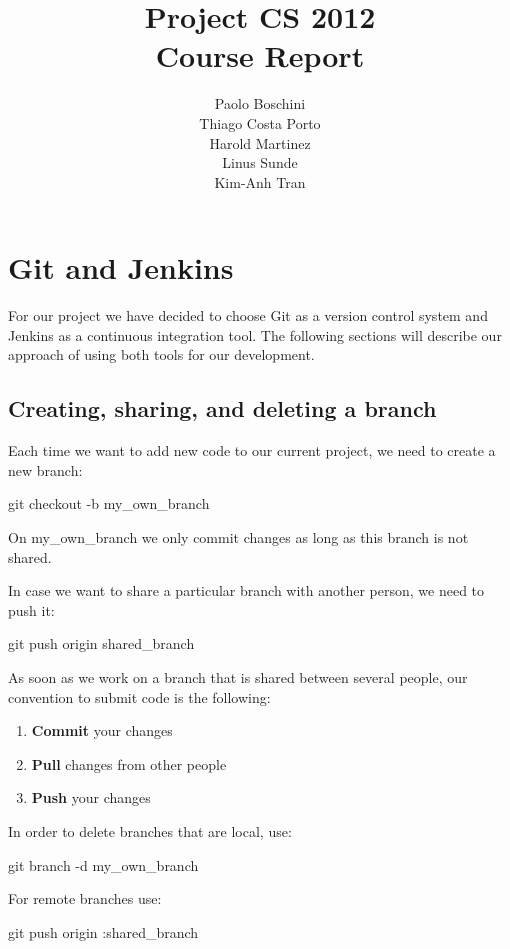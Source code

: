 \documentclass[11pt]{article}
\title{\textbf{Project CS 2012\\Course Report}}
\author{Paolo Boschini\\
		Thiago Costa Porto\\
		Harold Martinez\\
		Linus Sunde\\
		Kim-Anh Tran}
\date{}
\newenvironment{myindentpar}[1]%
 {\begin{list}{}%
         {\setlength{\leftmargin}{#1}}%
         \item[]%
 }
 {\end{list}}
\begin{document}
\maketitle

\section{Git and Jenkins}
For our project we have decided to choose Git as a version
control system and Jenkins as a continuous integration tool. 
The following sections will describe our approach of using
both tools for our development.

\subsection{Creating, sharing,  and deleting a branch}
Each time we want to add new code to our current project,
we need to create a new branch:

\begin{myindentpar}{3cm}
git checkout -b my\_own\_branch
\end{myindentpar}

On my\_own\_branch we only commit changes as long
as this branch is not shared. 

In case we want to share a particular branch with 
another person, we need to push it:

\begin{myindentpar}{3cm}
git push origin shared\_branch
\end{myindentpar}

As soon as we work on a branch that is shared between
several people, our convention to submit code is the following:

\begin{enumerate}
 \item \textbf{Commit} your changes
 \item \textbf{Pull} changes from other people
 \item \textbf{Push} your changes
\end{enumerate}

In order to delete branches that are local, use:

\begin{myindentpar}{3cm}
git branch -d my\_own\_branch
\end{myindentpar}

For remote branches use:

\begin{myindentpar}{3cm}
git push origin :shared\_branch
\end{myindentpar}
\end{document}
